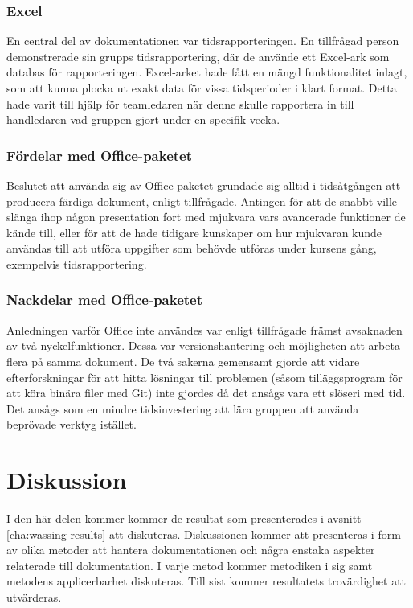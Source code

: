\subsubsection{Excel}
En central del av dokumentationen var tidsrapporteringen. En tillfrågad person demonstrerade sin grupps tidsrapportering, där de använde ett Excel-ark som databas för rapporteringen. Excel-arket hade fått en mängd funktionalitet inlagt, som att kunna plocka ut exakt data för vissa tidsperioder i klart format. Detta hade varit till hjälp för teamledaren när denne skulle rapportera in till handledaren vad gruppen gjort under en specifik vecka.

\subsubsection{Fördelar med Office-paketet}
Beslutet att använda sig av Office-paketet grundade sig alltid i tidsåtgången att producera färdiga dokument, enligt tillfrågade. Antingen för att de snabbt ville slänga ihop någon presentation fort med mjukvara vars avancerade funktioner de kände till, eller för att de hade tidigare kunskaper om hur mjukvaran kunde användas till att utföra uppgifter som behövde utföras under kursens gång, exempelvis tidsrapportering.

\subsubsection{Nackdelar med Office-paketet}
Anledningen varför Office inte användes var enligt tillfrågade främst avsaknaden av två nyckelfunktioner. Dessa var versionshantering och möjligheten att arbeta flera på samma dokument. De två sakerna gemensamt gjorde att vidare efterforskningar för att hitta lösningar till problemen (såsom tilläggsprogram för att köra binära filer med Git) inte gjordes då det ansågs vara ett slöseri med tid. Det ansågs som en mindre tidsinvestering att lära gruppen att använda beprövade verktyg istället.

\section{Diskussion}
\label{cha:wassing-discussion}
I den här delen kommer kommer de resultat som presenterades i avsnitt \ref{cha:wassing-results} att diskuteras. Diskussionen kommer att presenteras i form av olika metoder att hantera dokumentationen och några enstaka aspekter relaterade till dokumentation. I varje metod kommer metodiken i sig samt metodens applicerbarhet diskuteras. Till sist kommer resultatets trovärdighet att utvärderas.

